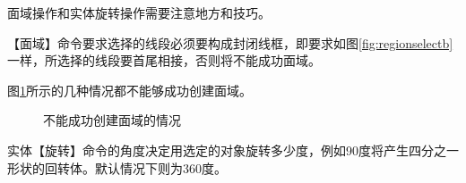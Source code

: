 面域操作和实体旋转操作需要注意地方和技巧。
\begin{tips}
\item 【面域】命令要求选择的线段必须要构成封闭线框，即要求如图\ref{fig:regionselectb}一样，所选择的线段要首尾相接，否则将不能成功面域。
\item 图\ref{fig:buchengong}所示的几种情况都不能够成功创建面域。
\begin{figure}[htbp]
\centering
{}\hspace{20pt}
\hspace{20pt}
\hspace{20pt}
\caption{不能成功创建面域的情况}\label{fig:buchengong}
\end{figure}
\item 实体【旋转】命令的角度决定用选定的对象旋转多少度，例如90度将产生四分之一形状的回转体。默认情况下则为360度。
\end{tips}
\endinput